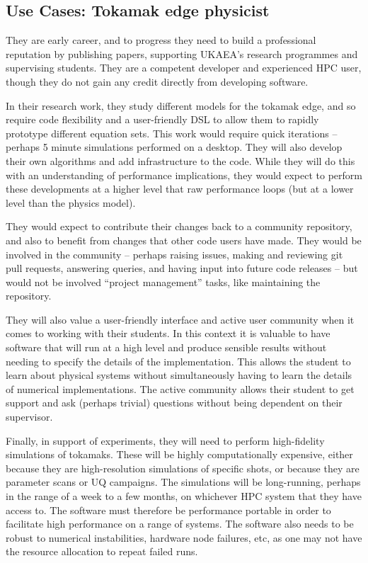 \subsection{Use Cases: Tokamak edge physicist}\label{sec:edge-boundary-tokamak-physicist}

They are early career, and to progress they need to build a professional
reputation by publishing papers, supporting UKAEA's research programmes
and supervising students. They are a competent developer and experienced
HPC user, though they do not gain any credit directly from developing
software.

In their research work, they study different models for the tokamak
edge, and so require code flexibility and a user-friendly DSL to allow
them to rapidly prototype different equation sets. This work would
require quick iterations -- perhaps 5 minute simulations performed on a
desktop. They will also develop their own algorithms and add
infrastructure to the code. While they will do this with an
understanding of performance implications, they would expect to perform
these developments at a higher level that raw performance loops (but at
a lower level than the physics model).

They would expect to contribute their changes back to a community
repository, and also to benefit from changes that other code users have
made. They would be involved in the community -- perhaps raising issues,
making and reviewing git pull requests, answering queries, and having input into
future code releases -- but would not be involved ``project management''
tasks, like maintaining the repository.

They will also value a user-friendly interface and active user community
when it comes to working with their students. In this context it is
valuable to have software that will run at a high level and produce
sensible results without needing to specify the details of the
implementation. This allows the student to learn about physical systems
without simultaneously having to learn the details of numerical
implementations. The active community allows their student to get
support and ask (perhaps trivial) questions without being dependent on
their supervisor.

Finally, in support of experiments, they will need to perform
high-fidelity simulations of tokamaks. These will be highly
computationally expensive, either because they are high-resolution
simulations of specific shots, or because they are parameter scans or UQ
campaigns. The simulations will be long-running, perhaps in the range of
a week to a few months, on whichever HPC system that they have access
to. The software must therefore be performance portable in order to
facilitate high performance on a range of systems. The software also
needs to be robust to numerical instabilities, hardware node failures,
etc, as one may not have the resource allocation to repeat failed runs.
